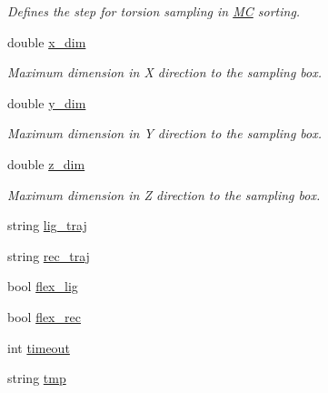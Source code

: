 \begin{DoxyCompactItemize}
\begin{DoxyCompactList}\small\item\em Defines the step for torsion sampling in \hyperlink{classMC}{MC} sorting. \item\end{DoxyCompactList}\item 
\hypertarget{classPARSER_add12f1baad1a8ddd2ddfda884ca591f9}{
double \hyperlink{classPARSER_add12f1baad1a8ddd2ddfda884ca591f9}{x\_\-dim}}
\label{classPARSER_add12f1baad1a8ddd2ddfda884ca591f9}

\begin{DoxyCompactList}\small\item\em Maximum dimension in X direction to the sampling box. \item\end{DoxyCompactList}\item 
\hypertarget{classPARSER_a686e3e4110b797bdd71685fa06cca819}{
double \hyperlink{classPARSER_a686e3e4110b797bdd71685fa06cca819}{y\_\-dim}}
\label{classPARSER_a686e3e4110b797bdd71685fa06cca819}

\begin{DoxyCompactList}\small\item\em Maximum dimension in Y direction to the sampling box. \item\end{DoxyCompactList}\item 
\hypertarget{classPARSER_a3a1ae30f803c95e3feb911ce17150429}{
double \hyperlink{classPARSER_a3a1ae30f803c95e3feb911ce17150429}{z\_\-dim}}
\label{classPARSER_a3a1ae30f803c95e3feb911ce17150429}

\begin{DoxyCompactList}\small\item\em Maximum dimension in Z direction to the sampling box. \item\end{DoxyCompactList}\item 
string \hyperlink{classPARSER_a0e2e4608457fc138a5f76dbba8b0ade2}{lig\_\-traj}
\item 
string \hyperlink{classPARSER_ae0e302d8902665dc3a9f9a42ae5e5a34}{rec\_\-traj}
\item 
bool \hyperlink{classPARSER_a974c6bc2d7250503d9dddece25abdb62}{flex\_\-lig}
\item 
bool \hyperlink{classPARSER_a9f3545bfdf2adb743c7cec9b7ebf904b}{flex\_\-rec}
\item 
int \hyperlink{classPARSER_afbcdf1c31d8279ba29032abe0cba11a8}{timeout}
\item 
\hypertarget{classPARSER_a795b4bf0cc52270df7557f5c53cd5df1}{
string \hyperlink{classPARSER_a795b4bf0cc52270df7557f5c53cd5df1}{tmp}}
\label{classPARSER_a795b4bf0cc52270df7557f5c53cd5df1}


\end{DoxyCompactItemize}
